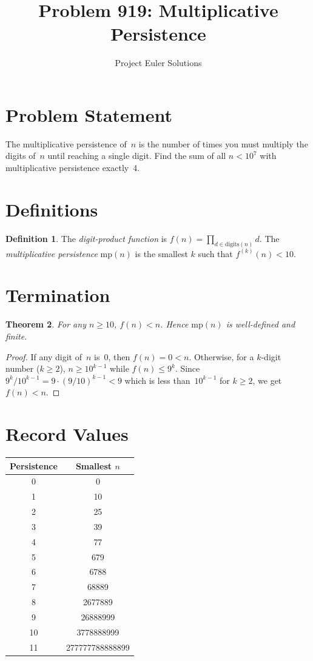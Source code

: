 \documentclass[11pt]{article}
\title{Problem 919: Multiplicative Persistence}
\author{Project Euler Solutions}
\date{}
\newtheorem{theorem}{Theorem}
\theoremstyle{definition}
\newtheorem{definition}[theorem]{Definition}
\begin{document}
\maketitle

\section{Problem Statement}

The multiplicative persistence of~$n$ is the number of times you must multiply the digits of~$n$ until reaching a single digit. Find the sum of all $n < 10^7$ with multiplicative persistence exactly~4.

\section{Definitions}

\begin{definition}
The \emph{digit-product function} is $f(n) = \prod_{d \in \mathrm{digits}(n)} d$. The \emph{multiplicative persistence} $\mathrm{mp}(n)$ is the smallest $k$ such that $f^{(k)}(n) < 10$.
\end{definition}

\section{Termination}

\begin{theorem}
For any $n \geq 10$, $f(n) < n$. Hence $\mathrm{mp}(n)$ is well-defined and finite.
\end{theorem}

\begin{proof}
If any digit of~$n$ is~0, then $f(n) = 0 < n$. Otherwise, for a $k$-digit number ($k \geq 2$), $n \geq 10^{k-1}$ while $f(n) \leq 9^k$. Since $9^k / 10^{k-1} = 9 \cdot (9/10)^{k-1} < 9$ which is less than~$10^{k-1}$ for $k \geq 2$, we get $f(n) < n$.
\end{proof}

\section{Record Values}

\begin{center}
\begin{tabular}{cc}
\toprule
Persistence & Smallest $n$ \\
\midrule
0 & 0 \\
1 & 10 \\
2 & 25 \\
3 & 39 \\
4 & 77 \\
5 & 679 \\
6 & 6788 \\
7 & 68889 \\
8 & 2677889 \\
9 & 26888999 \\
10 & 3778888999 \\
11 & 277777788888899 \\
\bottomrule
\end{tabular}
\end{center}
\end{document}
